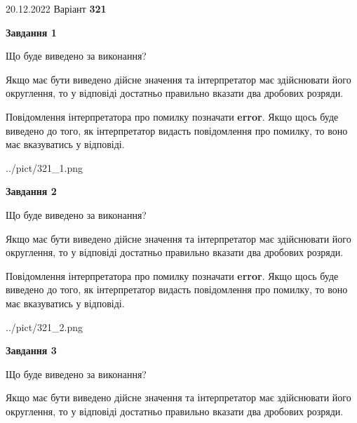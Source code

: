 \documentclass[12pt, ukrainian]{article}
\begin{document}
{20.12.2022 Варіант \No \textbf { 321 }\par}
{
\begin {Large}

{\begin {center}\textbf{Завдання 1}\end {center}}\par
Що буде виведено за виконання? \par

Якщо має бути виведено дійсне значення та інтерпретатор має здійснювати його округлення, 
то у відповіді достатньо правильно вказати два дробових розряди.

Повідомлення інтерпретатора про помилку позначати \textbf{error}.
Якщо щось буде виведено до того, як інтерпретатор видасть повідомлення про помилку, 
то воно має вказуватись у відповіді. \par

\begin{center}
	{../pict/321_1.png}
\end{center}
\newpage

{\begin {center}\textbf{Завдання 2}\end {center}}\par
Що буде виведено за виконання? \par

Якщо має бути виведено дійсне значення та інтерпретатор має здійснювати його округлення, 
то у відповіді достатньо правильно вказати два дробових розряди.

Повідомлення інтерпретатора про помилку позначати \textbf{error}.
Якщо щось буде виведено до того, як інтерпретатор видасть повідомлення про помилку, 
то воно має вказуватись у відповіді. \par

\begin{center}
	{../pict/321_2.png}
\end{center}
\newpage

{\begin {center}\textbf{Завдання 3}\end {center}}\par
Що буде виведено за виконання? \par

Якщо має бути виведено дійсне значення та інтерпретатор має здійснювати його округлення, 
то у відповіді достатньо правильно вказати два дробових розряди.


\end{Large}}
\end{document}
